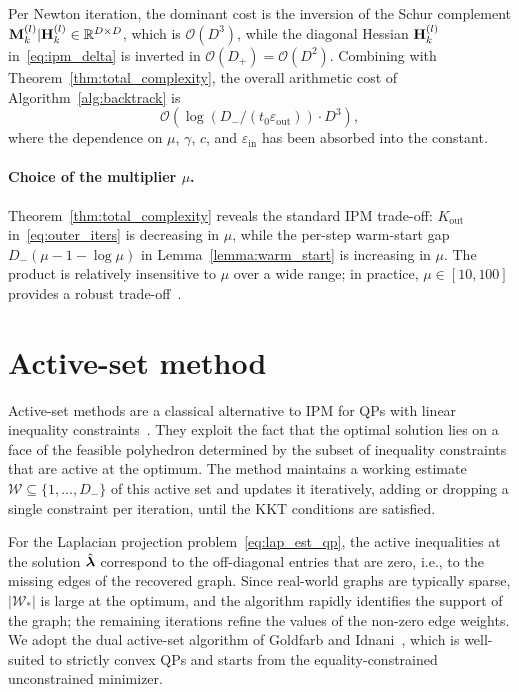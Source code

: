 Per Newton iteration, the dominant cost is the inversion of the Schur complement $\mathbf{M}_k^{(l)}|\mathbf{H}_k^{(l)}\in\mathbb{R}^{D\times D}$, which is $\mathcal{O}(D^3)$, while the diagonal Hessian $\mathbf{H}_k^{(l)}$ in~\eqref{eq:ipm_delta} is inverted in $\mathcal{O}(D_+)=\mathcal{O}(D^2)$. Combining with Theorem~\ref{thm:total_complexity}, the overall arithmetic cost of Algorithm~\ref{alg:backtrack} is
\begin{equation}\label{eq:ipm_total_cost}
	\mathcal{O}\!\left(\log\!\left(D_-/(t_0\varepsilon_\text{out})\right)\cdot D^3\right),
\end{equation}
where the dependence on $\mu$, $\gamma$, $c$, and $\varepsilon_\text{in}$ has been absorbed into the constant.

\paragraph{Choice of the multiplier $\mu$.} Theorem~\ref{thm:total_complexity} reveals the standard IPM trade-off: $K_\text{out}$ in~\eqref{eq:outer_iters} is decreasing in $\mu$, while the per-step warm-start gap $D_-(\mu-1-\log\mu)$ in Lemma~\ref{lemma:warm_start} is increasing in $\mu$. The product is relatively insensitive to $\mu$ over a wide range; in practice, $\mu\in[10,100]$ provides a robust trade-off~\cite[\S11.3.1]{ipm}.

\section{Active-set method}
\label{sec:active_set_method}

Active-set methods are a classical alternative to IPM for QPs with linear inequality constraints~\cite{nocedal2006numerical,goldfarb1983numerically}. They exploit the fact that the optimal solution lies on a face of the feasible polyhedron determined by the subset of inequality constraints that are active at the optimum. The method maintains a working estimate $\mathcal{W}\subseteq\{1,\ldots,D_-\}$ of this active set and updates it iteratively, adding or dropping a single constraint per iteration, until the KKT conditions are satisfied.

For the Laplacian projection problem~\eqref{eq:lap_est_qp}, the active inequalities at the solution $\hat{\boldsymbol{\lambda}}$ correspond to the off-diagonal entries that are zero, i.e., to the missing edges of the recovered graph. Since real-world graphs are typically sparse, $|\mathcal{W}_\ast|$ is large at the optimum, and the algorithm rapidly identifies the support of the graph; the remaining iterations refine the values of the non-zero edge weights. We adopt the dual active-set algorithm of Goldfarb and Idnani~\cite{goldfarb1983numerically}, which is well-suited to strictly convex QPs and starts from the equality-constrained unconstrained minimizer.

